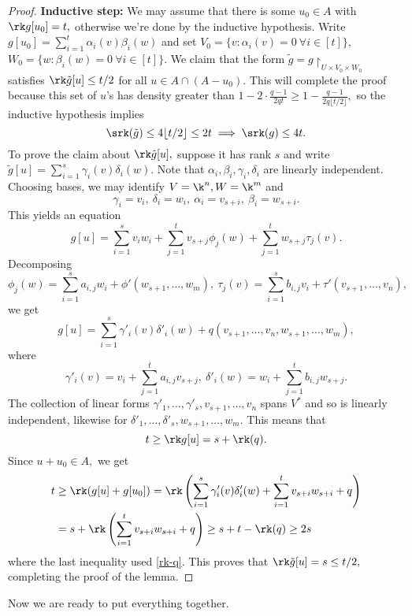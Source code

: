 \begin{proof}
         
         \textbf{Inductive step:} We may assume that there is some $u_0\in A$ with $\rk g[u_0] = t,$ otherwise we're done by the inductive hypothesis. Write $g[u_0] = \sum_{i=1}^t \alpha_i(v)\beta_i(w)$ and set $V_0 = \{v:\alpha_i(v) = 0\ \forall i\in[t]\},$ $W_0 = \{w:\beta_i(w) = 0\ \forall i\in[t]\}.$ We claim that the form $\tilde g = g\restriction_{U\times V_0\times W_0}$ satisfies $\rk \tilde g[u] \le t/2 $ for all \linebreak $u\in A\cap (A-u_0).$ This will complete the proof because this set of $u$'s has density greater than $ 1-2\cdot \frac{q-1}{2qt} \ge 1- \frac{q-1}{2q\lfloor t/2\rfloor}, $ so the inductive hypothesis implies 
         \[
         \srk (\tilde g) \le 4\lfloor t/2\rfloor \le 2t \implies \srk(g) \le 4t.
         \]
        To prove the claim about $\rk \tilde g[u],$ suppose it has rank $s$ and write $\tilde g[u] = \sum_{i=1}^s \gamma_i(v)\delta_i(w).$ Note that $\alpha_i,\beta_i,\gamma_i,\delta_i$ are  linearly independent. Choosing bases, we may identify $V=\k^n,W=\k^m$ and $$ \gamma_i = v_i,\ \delta_i = w_i,\  \alpha_i = v_{s+i},\ \beta_i = w_{s+i}.$$ This yields an equation
         \[
         g[u] = \sum_{i=1}^s v_iw_i +\sum_{j=1}^t  v_{s+j} \phi_j (w)+\sum_{j=1}^t  w_{s+j} \tau_j (v).
         \]
         Decomposing $$\phi_j(w) = \sum_{i=1}^s a_{i,j} w_i + \phi'(w_{s+1},\ldots,w_m),\ \tau_j(v) = \sum_{i=1}^s b_{i,j} v_i + \tau'(v_{s+1},\ldots,v_n),$$ 
         we get 
         \[
         g[u] = \sum_{i=1}^s  \gamma'_i(v) \delta'_i(w) +q(v_{s+1},\ldots,v_n,w_{s+1},\ldots,w_m),
         \]
         where 
         \[
         \gamma'_i(v) = v_i+\sum_{j=1}^t a_{i,j} v_{s+j},\ \delta'_i(w)= w_i+\sum_{j=1}^t b_{i,j} w_{s+j}.
         \]
         The collection of linear forms $\gamma'_1,\ldots,\gamma'_s,v_{s+1},\ldots,v_n$ spans $V^*$ and so is linearly independent, likewise for $\delta'_1,\ldots,\delta'_s,w_{s+1},\ldots,w_m.$ This means that 
         \begin{equation}\label{rk-q}
             t\ge \rk g[u] = s+ \rk(q).
         \end{equation}
         Since $u+u_0\in A,$ we get 
         \begin{align*}
             t &\ge \rk(g[u]+g[u_0]) = \rk \left(\sum_{i=1}^s  \gamma'_i(v) \delta'_i(w)+\sum_{i=1}^t v_{s+i} w_{s+i}+q\right) \\
             &= s+\rk\left(\sum_{i=1}^t v_{s+i} w_{s+i}+q\right) \ge s+t-\rk(q) \ge 2s
         \end{align*}
         where the last inequality used \eqref{rk-q}. This proves that $\rk\tilde g[u] = s\le t/2,$ completing the proof of the lemma.
    \end{proof}
    Now we are ready to put everything together.

